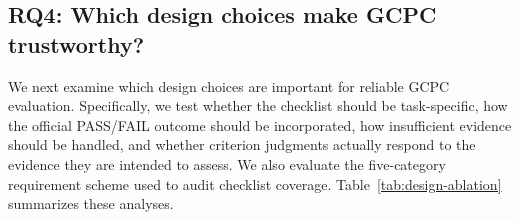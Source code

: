 \documentclass[sigconf,nonacm]{acmart}
\DeclareMathOperator{\cpc}{GCPC}
\begin{document}

\subsection{RQ4: Which design choices make GCPC trustworthy?}
\label{sec:ablation}

We next examine which design choices are important for reliable GCPC evaluation. Specifically, we test whether the checklist should be task-specific, how the official PASS/FAIL outcome should be incorporated, how insufficient evidence should be handled, and whether criterion judgments actually respond to the evidence they are intended to assess. We also evaluate the five-category requirement scheme used to audit checklist coverage. Table~\ref{tab:design-ablation} summarizes these analyses.
\end{document}
